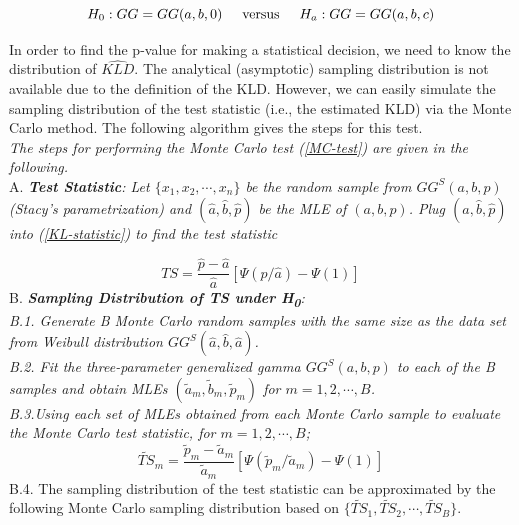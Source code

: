 \documentclass{ps}
\theoremstyle{plain}%
\theoremstyle{definition}
\theoremstyle{remark}
\begin{document}
\begin{equation}\label{MC-test}
	H_0: GG = GG(a,b,0)  \hspace{5mm} \mbox{versus} \hspace{5mm}  H_a: GG = GG(a, b, c)
\end{equation}

In order to find the p-value for making a statistical decision, we need to know the distribution of  $\widehat{KLD}$. The analytical (asymptotic) sampling distribution is not available due to the definition of the KLD. However, we can easily simulate the sampling distribution of the test statistic (i.e., the estimated KLD) via the Monte Carlo method. The following algorithm gives the steps for this test.\\

 \emph{The steps for performing the Monte Carlo test (\ref{MC-test}) are given in the following.}\\
\noindent A. \emph{{\bf Test Statistic}: Let $\{ x_1, x_2, \cdots, x_n\}$ be the random sample from $GG^S(a, b, p)$ (Stacy's parametrization) and $(\hat{a}, \hat{b}, \hat{p})$ be the MLE of $(a, b, p)$. Plug $(\hat{a}, \hat{b}, \hat{p})$ into (\ref{KL-statistic}) to find the test statistic}  

\begin{equation}\label{TS}
	TS = \frac{\hat{p}-\hat{a}}{\hat{a}}\left[\Psi(\hat{p}/\hat{a})-\Psi(1) \right]
\end{equation}
\noindent B. \emph{{\bf Sampling Distribution of TS under H\textsubscript{0}}:\\ 
	B.1. Generate B Monte Carlo random samples with the same size as the data set from Weibull distribution $GG^S(\hat{a}, \hat{b}, \hat{a})$. \\
	B.2. Fit the three-parameter generalized gamma $GG^S(a, b, p)$ to each of the B samples and obtain MLEs $(\tilde{a}_m, \tilde{b}_m, \tilde{p}_m)$ for $m = 1, 2, \cdots, B$. \\
	B.3.Using each set of MLEs obtained from each Monte Carlo sample to evaluate the Monte Carlo test statistic, for $m =1, 2, \cdots, B$; }
\begin{equation}\label{TS-MC}
	\widetilde{TS}_m = \frac{\tilde{p}_m-\tilde{a}_m}{\tilde{a}_m}\left[\Psi(\tilde{p}_m/\tilde{a}_m)-\Psi(1) \right]
\end{equation}
B.4. The sampling distribution of the test statistic can be approximated by the following Monte Carlo sampling distribution based on $\{\widetilde{TS}_1, \widetilde{TS}_2, \cdots, \widetilde{TS}_B \}$.\\
\end{document}
